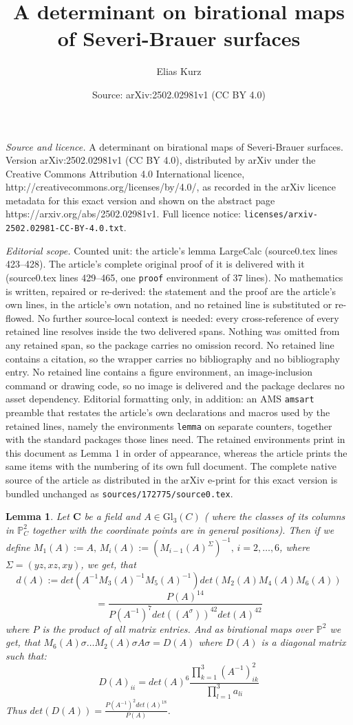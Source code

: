 \documentclass[10pt,a4paper]{amsart}
\title{A determinant on birational maps of Severi-Brauer surfaces}
\author{Elias Kurz}
\date{Source: arXiv:2502.02981v1 (CC BY 4.0)}
\newtheorem{lemma}{Lemma}
\begin{document}
\maketitle

\noindent\emph{Source and licence.} A determinant on birational maps of Severi-Brauer surfaces. Version arXiv:2502.02981v1 (CC BY 4.0), distributed by arXiv under the Creative Commons Attribution 4.0 International licence, http://creativecommons.org/licenses/by/4.0/, as recorded in the arXiv licence metadata for this exact version and shown on the abstract page https://arxiv.org/abs/2502.02981v1. Full licence notice: \texttt{licenses/arxiv-2502.02981-CC-BY-4.0.txt}.\par\smallskip

\noindent\textit{Editorial scope.} Counted unit: the article's lemma LargeCalc (source0.tex lines 423--428). The article's complete original proof of it is delivered with it (source0.tex lines 429--465, one \texttt{proof} environment of 37 lines). No mathematics is written, repaired or re-derived: the statement and the proof are the article's own lines, in the article's own notation, and no retained line is substituted or re-flowed.  No further source-local context is needed: every cross-reference of every retained line resolves inside the two delivered spans.  Nothing was omitted from any retained span, so the package carries no omission record.  No retained line contains a citation, so the wrapper carries no bibliography and no bibliography entry.  No retained line contains a figure environment, an image-inclusion command or drawing code, so no image is delivered and the package declares no asset dependency.  Editorial formatting only, in addition: an AMS \texttt{amsart} preamble that restates the article's own declarations and macros used by the retained lines, namely the environments \texttt{lemma} on separate counters, together with the standard packages those lines need.  The retained environments print in this document as Lemma 1 in order of appearance, whereas the article prints the same items with the numbering of its own full document.  The complete native source of the article as distributed in the arXiv e-print for this exact version is bundled unchanged as \texttt{sources/172775/source0.tex}.
\begin{lemma} \label{LargeCalc}
    Let $\textbf{C}$ be a field and $A \in \mathrm{Gl}_3(C)$ ( where the classes of its columns in $\mathbb{P}^2_C$ together with the coordinate points are in general positions). Then if we define $M_1(A):= A, \, M_i(A) := (M_{i-1}(A)^{\Sigma})^{-1}, \, i=2, \dots , 6$, where $\Sigma = (yz,xz,xy)$, we get, that \[d(A):= det(A^{-1}M_3(A)^{-1}M_5(A)^{-1})det(M_2(A)M_4(A)M_6(A))\] \[= \frac{P(A)^{14}}{P(A^{-1})^7 det((A^{\sigma}))^{42}det(A)^{42}}\] where $P$ is the product of all matrix entries. And as birational maps over $\mathbb{P}^2$ we get, that $M_6(A) \sigma \dots M_2(A) \sigma A \sigma = D(A)$ where $D(A)$ is a diagonal matrix such that:
    \newline
    \[D(A)_{ii} = det(A)^6\frac{\prod_{k=1}^3(A^{-1})_{ik}^2}{\prod_{l=1}^3a_{li}}\]
    Thus $det(D(A)) =\frac{P(A^{-1})^2det(A)^{18}}{P(A)}$.
\end{lemma}
\end{document}
